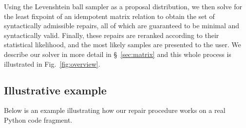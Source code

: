 \documentclass[sigplan,review,anonymous,acmsmall]{acmart}\settopmatter{printfolios=false,printccs=false,printacmref=false}
\begin{document}
Using the Levenshtein ball sampler as a proposal distribution, we then solve for the least fixpoint of an idempotent matrix relation to obtain the set of syntactically admissible repairs, all of which are guaranteed to be minimal and syntactically valid. Finally, these repairs are reranked according to their statistical likelihood, and the most likely samples are presented to the user. We describe our solver in more detail in \S~\ref{sec:matrix} and this whole process is illustrated in Fig.~\ref{fig:overview}.

\subsection{Illustrative example}

Below is an example illustrating how our repair procedure works on a real Python code fragment.
\end{document}
